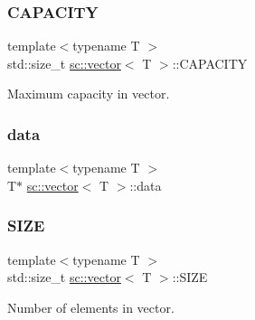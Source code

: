 \subsubsection{\texorpdfstring{C\+A\+P\+A\+C\+I\+TY}{CAPACITY}}
{\footnotesize\ttfamily template$<$typename T $>$ \\
std\+::size\+\_\+t \hyperlink{classsc_1_1vector}{sc\+::vector}$<$ T $>$\+::C\+A\+P\+A\+C\+I\+TY\hspace{0.3cm}{\ttfamily [private]}}



Maximum capacity in vector. 

\mbox{\label{classsc_1_1vector_ab0607397430a55a5a484dfea79867467}} 
\subsubsection{\texorpdfstring{data}{data}}
{\footnotesize\ttfamily template$<$typename T $>$ \\
T$\ast$ \hyperlink{classsc_1_1vector}{sc\+::vector}$<$ T $>$\+::data\hspace{0.3cm}{\ttfamily [private]}}

\mbox{\label{classsc_1_1vector_ad6729b20ad502c5fdf480fec848476f6}} 
\subsubsection{\texorpdfstring{S\+I\+ZE}{SIZE}}
{\footnotesize\ttfamily template$<$typename T $>$ \\
std\+::size\+\_\+t \hyperlink{classsc_1_1vector}{sc\+::vector}$<$ T $>$\+::S\+I\+ZE\hspace{0.3cm}{\ttfamily [private]}}



Number of elements in vector. 

